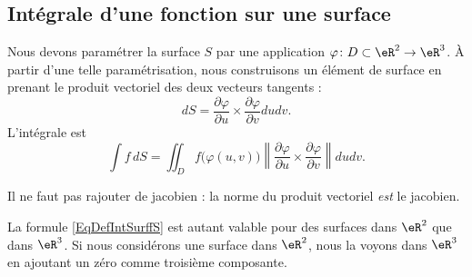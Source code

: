 \subsection{Intégrale d'une fonction sur une surface}

Nous devons paramétrer la surface $S$ par une application $\varphi\colon D\subset\eR^2\to \eR^3$. À partir d'une telle paramétrisation, nous construisons un élément de surface en prenant le produit vectoriel des deux vecteurs tangents :
\begin{equation}
    dS=\frac{ \partial \varphi }{ \partial u }\times\frac{ \partial \varphi }{ \partial v }dudv.
\end{equation}
L'intégrale est
\begin{equation}        \label{EqDefIntSurffS}
    \int f\,dS=\iint_Df\big( \varphi(u,v) \big)\left\| \frac{ \partial \varphi }{ \partial u }\times\frac{ \partial \varphi }{ \partial v } \right\|dudv.
\end{equation}

Il ne faut pas rajouter de jacobien : la norme du produit vectoriel \emph{est} le jacobien.

\begin{remark}
    La formule \eqref{EqDefIntSurffS} est autant valable pour des surfaces dans $\eR^2$ que dans $\eR^3$. Si nous considérons une surface dans $\eR^2$, nous la voyons dans $\eR^3$ en ajoutant un zéro comme troisième composante.
\end{remark}

